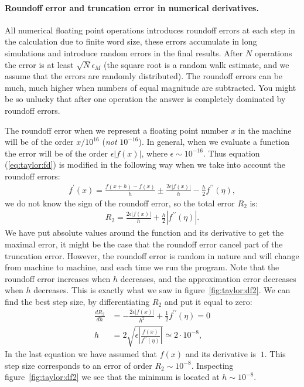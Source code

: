 \documentclass[graybox,sectrefs,envcountresetchap,open=right,final]{svmonodo}
\newenvironment{graybox2admon}[1][]{
\begin{graybox2mdframed}[frametitle=#1]
}
{
\end{graybox2mdframed}
}
\begin{document}
\paragraph{Roundoff error and truncation error in numerical derivatives.}


\begin{graybox2admon}[Roundoff Errors]
All numerical floating point operations introduces roundoff errors at each step in the calculation due to finite word size, these errors accumulate in long simulations and introduce random errors in the final results. After $N$ operations the error is at least $\sqrt{N}\epsilon_M$ (the square root is a random walk estimate, and we assume that the errors are randomly distributed). The roundoff errors can be much, much higher when numbers of equal magnitude are subtracted. You might be so unlucky that after one operation the answer is completely dominated by roundoff errors.
\end{graybox2admon}




The roundoff error when we represent a floating point number $x$ in the 
machine will be of the order $x/10^{16}$ (\emph{not} $10^{-16}$). In general, when we evaluate a function the error will be of the order 
$\epsilon|f(x)|$, where $\epsilon\sim10^{-16}$. Thus equation (\ref{eq:taylor:fd}) is modified in the following way when we take into account the roundoff errors:
\begin{align}
f^\prime(x)=\frac{f(x+h)-f(x)}{h}\pm\frac{2\epsilon|f(x)|}{h}-\frac{h}{2}f^{\prime\prime}(\eta),\label{eq:taylor:derr2}
\end{align}
we do not know the sign of the roundoff error, so the total error $R_2$ is:
\begin{align}
R_2=\frac{2\epsilon|f(x)|}{h}+\frac{h}{2}|f^{\prime\prime}(\eta)|.\label{eq:taylor:derr3}
\end{align}
We have put absolute values around the function and its derivative to get the maximal error, it might be the case that the roundoff error cancel part of the 
truncation error. However, the roundoff error is random in nature and will change from machine to machine, and each time we run the program. 
Note that the roundoff error increases when $h$ decreases, and the approximation error decreases when $h$ decreases. This is exactly what we saw in figure~\ref{fig:taylor:df2}. We can find the 
best step size, by differentiating $R_2$ and put it equal to zero:
\begin{align}
\frac{dR_2}{dh}&=-\frac{2\epsilon|f(x)|}{h^2}+\frac{1}{2}f^{\prime\prime}(\eta)=0\nonumber\\ 
h&=2\sqrt{\epsilon\left|\frac{f(x)}{f^{\prime\prime}(\eta)}\right|}\simeq 2\cdot10^{-8},\label{eq:taylor:derr4}
\end{align}
In the last equation we have assumed that $f(x)$ and its derivative is $~1$. This step size corresponds to an error of order $R_2\sim10^{-8}$. 
Inspecting figure~\ref{fig:taylor:df2} we see that the minimum is located at $h\sim10^{-8}$.      
\end{document}
